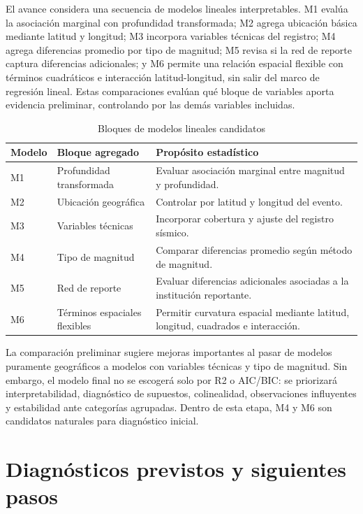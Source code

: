 \documentclass{style}
\newcommand{\reporttablesize}{\footnotesize}
\begin{document}
El avance considera una secuencia de modelos lineales interpretables. M1 evalúa la asociación marginal con profundidad transformada; M2 agrega ubicación básica mediante latitud y longitud; M3 incorpora variables técnicas del registro; M4 agrega diferencias promedio por tipo de magnitud; M5 revisa si la red de reporte captura diferencias adicionales; y M6 permite una relación espacial flexible con términos cuadráticos e interacción latitud-longitud, sin salir del marco de regresión lineal. Estas comparaciones evalúan qué bloque de variables aporta evidencia preliminar, controlando por las demás variables incluidas.

\begin{table}[H]
\centering
\caption{Bloques de modelos lineales candidatos}
\reporttablesize
\begin{tabularx}{\textwidth}{llX}
\toprule
Modelo & Bloque agregado & Propósito estadístico \\
\midrule
M1 & Profundidad transformada & Evaluar asociación marginal entre magnitud y profundidad. \\
M2 & Ubicación geográfica & Controlar por latitud y longitud del evento. \\
M3 & Variables técnicas & Incorporar cobertura y ajuste del registro sísmico. \\
M4 & Tipo de magnitud & Comparar diferencias promedio según método de magnitud. \\
M5 & Red de reporte & Evaluar diferencias adicionales asociadas a la institución reportante. \\
M6 & Términos espaciales flexibles & Permitir curvatura espacial mediante latitud, longitud, cuadrados e interacción. \\
\bottomrule
\end{tabularx}
\end{table}

{\reporttablesize

}

La comparación preliminar sugiere mejoras importantes al pasar de modelos puramente geográficos a modelos con variables técnicas y tipo de magnitud. Sin embargo, el modelo final no se escogerá solo por R2 o AIC/BIC: se priorizará interpretabilidad, diagnóstico de supuestos, colinealidad, observaciones influyentes y estabilidad ante categorías agrupadas. Dentro de esta etapa, M4 y M6 son candidatos naturales para diagnóstico inicial.

\section{Diagnósticos previstos y siguientes pasos}
\end{document}
